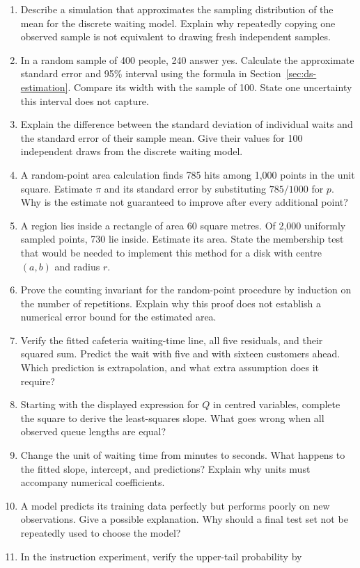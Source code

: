 \begin{enumerate}
\item Describe a simulation that approximates the sampling distribution
of the mean for the discrete waiting model. Explain why repeatedly copying
one observed sample is not equivalent to drawing fresh independent samples.
\item In a random sample of 400 people, 240 answer yes. Calculate the
approximate standard error and 95\% interval using the formula in
Section~\ref{sec:ds-estimation}. Compare its width with the sample of 100.
State one uncertainty this interval does not capture.
\item Explain the difference between the standard deviation of individual
waits and the standard error of their sample mean. Give their values for
100 independent draws from the discrete waiting model.
\item A random-point area calculation finds 785 hits among 1,000 points
in the unit square. Estimate $\pi$ and its standard error by substituting
$785/1000$ for $p$. Why is the estimate not guaranteed to improve after
every additional point?
\item A region lies inside a rectangle of area 60 square metres. Of 2,000
uniformly sampled points, 730 lie inside. Estimate its area. State the
membership test that would be needed to implement this method for a disk
with centre $(a,b)$ and radius $r$.
\item Prove the counting invariant for the random-point procedure by
induction on the number of repetitions. Explain why this proof does not
establish a numerical error bound for the estimated area.
\item Verify the fitted cafeteria waiting-time line, all five residuals, and their
squared sum. Predict the wait with five and with sixteen customers ahead. Which prediction is
extrapolation, and what extra assumption does it require?
\item Starting with the displayed expression for $Q$ in centred variables,
complete the square to derive the least-squares slope. What goes wrong
when all observed queue lengths are equal?
\item Change the unit of waiting time from minutes to seconds. What happens
to the fitted slope, intercept, and predictions? Explain why units must
accompany numerical coefficients.
\item A model predicts its training data perfectly but performs poorly on
new observations. Give a possible explanation. Why should a final test
set not be repeatedly used to choose the model?
\item In the instruction experiment, verify the upper-tail probability by

\end{enumerate}
